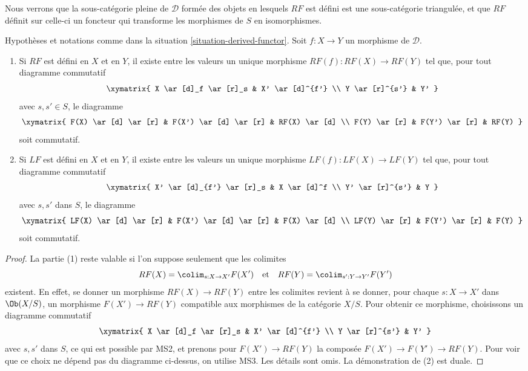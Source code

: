 \noindent
Nous verrons que la sous-catégorie pleine de $\mathcal{D}$ formée des objets
en lesquels $RF$ est défini est une sous-catégorie triangulée, et que $RF$
définit sur celle-ci un foncteur qui transforme les morphismes de $S$ en
isomorphismes.

\begin{lemma}
\label{lemma-derived-functor}
Hypothèses et notations comme dans la
situation \ref{situation-derived-functor}. Soit $f : X \to Y$ un morphisme de
$\mathcal{D}$.
\begin{enumerate}
\item Si $RF$ est défini en $X$ et en $Y$, il existe entre les valeurs un
unique morphisme $RF(f) : RF(X) \to RF(Y)$ tel que, pour tout diagramme
commutatif
$$
\xymatrix{
X \ar[d]_f \ar[r]_s & X' \ar[d]^{f'} \\
Y \ar[r]^{s'} & Y'
}
$$
avec $s, s' \in S$, le diagramme
$$
\xymatrix{
F(X) \ar[d] \ar[r] & F(X') \ar[d] \ar[r] & RF(X) \ar[d] \\
F(Y) \ar[r] & F(Y') \ar[r] & RF(Y)
}
$$
soit commutatif.
\item Si $LF$ est défini en $X$ et en $Y$, il existe entre les valeurs un
unique morphisme $LF(f) : LF(X) \to LF(Y)$ tel que, pour tout diagramme
commutatif
$$
\xymatrix{
X' \ar[d]_{f'} \ar[r]_s & X \ar[d]^f \\
Y' \ar[r]^{s'} & Y
}
$$
avec $s, s'$ dans $S$, le diagramme
$$
\xymatrix{
LF(X) \ar[d] \ar[r] & F(X') \ar[d] \ar[r] & F(X) \ar[d] \\
LF(Y) \ar[r] & F(Y') \ar[r] & F(Y)
}
$$
soit commutatif.
\end{enumerate}
\end{lemma}

\begin{proof}
La partie (1) reste valable si l'on suppose seulement que les colimites
$$
RF(X) = \colim_{s : X \to X'} F(X')
\quad\text{et}\quad
RF(Y) = \colim_{s' : Y \to Y'} F(Y')
$$
existent. En effet, se donner un morphisme $RF(X) \to RF(Y)$ entre les
colimites revient à se donner, pour chaque
$s : X \to X'$ dans $\Ob(X/S)$, un morphisme $F(X') \to RF(Y)$ compatible aux
morphismes de la catégorie $X/S$. Pour obtenir ce morphisme, choisissons un
diagramme commutatif
$$
\xymatrix{
X \ar[d]_f \ar[r]_s & X' \ar[d]^{f'} \\
Y \ar[r]^{s'} & Y'
}
$$
avec $s, s'$ dans $S$, ce qui est possible par MS2, et prenons pour
$F(X') \to RF(Y)$ la composée $F(X') \to F(Y') \to RF(Y)$. Pour voir que ce
choix ne dépend pas du diagramme ci-dessus, on utilise MS3. Les détails sont
omis. La démonstration de (2) est duale.
\end{proof}

